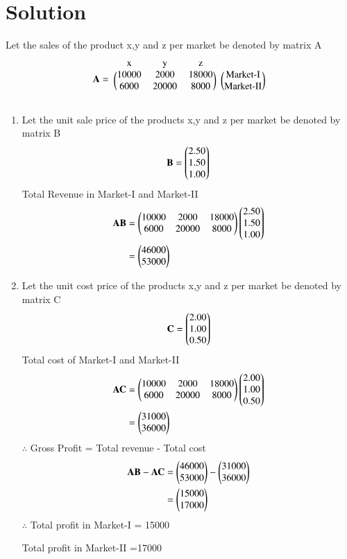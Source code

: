 \documentclass[journal,12pt,twocolumn]{IEEEtran}
\begin{document}
\section{Solution}
Let the sales of the product x,y and z per market be denoted by  matrix A
\begin{align}
\vec{A}=
\begin{blockarray}{cccc}
\text{x} & \text{y} & \text{z} \\
\begin{block}{(ccc)(c)}
10000 & 2000 & 18000 & \text{Market-I}\\
6000 & 20000 & 8000 & \text{Market-II} \\
\end{block}
\end{blockarray}
\end{align}
\begin {enumerate}
\item
Let the unit sale price of the products x,y and z per market be denoted by matrix B
\begin{align}
\mathbf{B}=\begin{pmatrix}2.50\\1.50\\1.00\end{pmatrix}
\end{align}
Total Revenue in Market-I and Market-II
\begin{align}
\mathbf{A}\mathbf{B}&=\begin{pmatrix}10000&2000&18000\\6000&20000&8000\end{pmatrix}\begin{pmatrix}2.50\\1.50\\1.00\end{pmatrix}\\
&=\begin{pmatrix}46000\\53000\end{pmatrix}
\end{align}
\item
Let the unit cost price of the products x,y and z per market be denoted by matrix C
\begin{align}
\mathbf{C}=\begin{pmatrix}2.00\\1.00\\0.50\end{pmatrix}
\end{align}
Total cost of Market-I and Market-II
\begin{align}
\mathbf{A}\mathbf{C}&=\begin{pmatrix}10000&2000&18000\\6000&20000&8000\end{pmatrix}\begin{pmatrix}2.00\\1.00\\0.50\end{pmatrix}\\
&=\begin{pmatrix}31000\\36000\end{pmatrix}
\end{align}
$\therefore$ Gross Profit = Total revenue - Total cost
\begin{align}
\mathbf{A}\mathbf{B}-\mathbf{A}\mathbf{C}&=\begin{pmatrix}46000\\53000\end{pmatrix} - \begin{pmatrix}31000\\36000\end{pmatrix}  \\
&=\begin{pmatrix}15000\\17000\end{pmatrix}
\end{align}
$\therefore$ Total profit in Market-I = 15000

Total profit in Market-II =17000
\end{enumerate}
\end{document}
